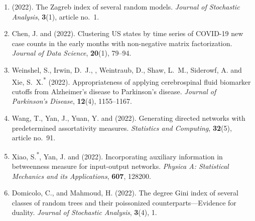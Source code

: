 \begin{enumerate}[resume=journalpubs]
\begin{pubentry}
\par\end{pubentry}
\item\begin{pubentry} \PZ{} (2022). The Zagreb index of several random models. \emph{Journal of Stochastic Analysis}, \textbf{3}(1), article no.\ 1.

\par\end{pubentry}
\item\begin{pubentry} Chen, J. and \PZ{} (2022). Clustering US states by time series of COVID-19 new case counts in the early months with non-negative matrix factorization. \emph{Journal of Data Science}, \textbf{20}(1), 79--94.

\par\end{pubentry}
\item\begin{pubentry} Weinshel, S., Irwin, D.\ J., \PZnot{}, Weintraub, D., Shaw, L.\ M., Siderowf, A. and Xie, S.\ X.\textsuperscript{*} (2022). Appropriateness of applying cerebrospinal fluid biomarker cutoffs from Alzheimer's disease to Parkinson's disease. \emph{Journal of Parkinson's Disease}, \textbf{12}(4), 1155--1167.

\par\end{pubentry}
\item\begin{pubentry} Wang, T., Yan, J., Yuan, Y. and \PZ{} (2022). Generating directed networks with predetermined assortativity measures. \emph{Statistics and Computing}, \textbf{32}(5), article no.\ 91.

\par\end{pubentry}
\item\begin{pubentry} Xiao, S.\textsuperscript{*}, Yan, J. and \PZnot{} (2022). Incorporating auxiliary information in betweenness measure for input-output networks. \emph{Physica A: Statistical Mechanics and its Applications}, \textbf{607}, 128200.

\par\end{pubentry}
\item\begin{pubentry} Domicolo, C., \PZ{} and Mahmoud, H. (2022). The 
degree Gini index of several classes of random trees and their 
poissonized counterparts---Evidence for duality. \emph{Journal of 
Stochastic Analysis}, \textbf{3}(4), 1.
\par\end{pubentry}
\end{enumerate}
